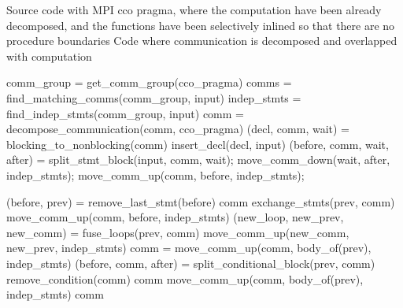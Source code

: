 
\begin{algorithm}
{\scriptsize
\begin{algorithmic}
\Require Source code with MPI cco pragma,
\State where the computation have been already decomposed, and
\State the functions have been selectively inlined so that there are no procedure boundaries
\Ensure Code where communication is decomposed and overlapped with computation

  \State comm\_group = get\_comm\_group(cco\_pragma) %
  \State comms = find\_matching\_comms(comm\_group, input) %
  \State indep\_stmts = find\_indep\_stmts(comm\_group, input) %
      \State comm = decompose\_communication(comm, cco\_pragma)
    \EndIf
    \State (decl, comm, wait) = blocking\_to\_nonblocking(comm) %
    \State insert\_decl(decl, input)
    \State (before, comm, wait, after) = split\_stmt\_block(input, comm, wait);
    \State move\_comm\_down(wait, after, indep\_stmts);
    \State move\_comm\_up(comm, before, indep\_stmts);
  \EndFor
\EndFunction

  \State (before, prev) = remove\_last\_stmt(before)
    \State \Return comm
    \State exchange\_stmts(prev, comm)
    \State \Return move\_comm\_up(comm, before, indep\_stmts)
    \State (new\_loop, new\_prev, new\_comm) = fuse\_loops(prev, comm)
    \State \Return move\_comm\_up(new\_comm, new\_prev, indep\_stmts)
    \State comm = move\_comm\_up(comm, body\_of(prev), indep\_stmts)
      \State (before, comm, after) = split\_conditional\_block(prev, comm)
      \State remove\_condition(comm)
    \EndIf
    \State \Return comm
    \State \Return move\_comm\_up(comm, body\_of(prev), indep\_stmts)
  \Else
    \State \Return comm
  \EndIf
\EndFunction


\end{algorithmic}}
\end{algorithm}
